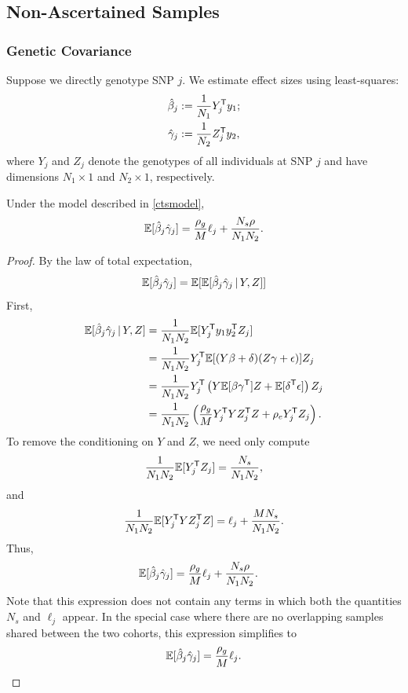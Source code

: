 \documentclass[11pt]{article}
\numberwithin{equation}{section}
\numberwithin{definition}{section}
\numberwithin{thm}{section}
\numberwithin{lemma}{section}
\numberwithin{prop}{section}
\numberwithin{cor}{section}
\numberwithin{hyp}{section}
\begin{document}
\subsection{Non-Ascertained Samples}
\subsubsection{Genetic Covariance}
\label{supp_condexp_qt}
Suppose we directly genotype SNP $j$. 
We estimate effect sizes using least-squares: 
\begin{align*}
	\hat{\beta}_j &:= \frac{1}{N_1}Y^{\mathsf{T}}_jy_1;\\
	\hat{\gamma}_j &:= \frac{1}{N_2}Z^{\mathsf{T}}_jy_2,
\end{align*}
where $Y_j$ and $Z_j$ denote the genotypes of all individuals at SNP $j$ 
and have dimensions $N_1\times 1$ and $N_2\times 1$, respectively.

\begin{prop} 
Under the model described in \ref{ctsmodel}, 
\begin{equation}
	\mathbb{E}[\hat{\beta}_j\hat{\gamma}_j] = \frac{\rho_g}{M}\ell_j  + \frac{N_s\rho}{N_1N_2}.
\end{equation}
\end{prop}

\begin{proof} By the law of total expectation, 
$$\mathbb{E}[\hat{\beta}_j\hat{\gamma}_j] = \mathbb{E}[ \mathbb{E}[\hat{\beta}_j\hat{\gamma}_j \,|\, Y, Z ] ]$$
\noindent
First,
\begin{align*}
	\mathbb{E}[\hat{\beta}_j\hat{\gamma}_j\,|\,Y,Z] &= \frac{1}{N_1N_2}\mathbb{E}[Y^{\mathsf{T}}_jy_1y_2^{\mathsf{T}}Z_j]   \\
       		&= \frac{1}{N_1N_2}Y^{\mathsf{T}}_j\mathbb{E}[{(Y\beta+\delta)}(Z\gamma+\epsilon)]Z_j\\
        		&= \frac{1}{N_1N_2}Y^{\mathsf{T}}_j\left(Y\mathbb{E}[\beta\gamma^{\mathsf{T}}]Z + \mathbb{E}[\delta^{\mathsf{T}}\epsilon]\right)Z_j\\
        		&= \frac{1}{N_1N_2}\left( \frac{\rho_g}{M} Y^{\mathsf{T}}_jYZ^{\mathsf{T}}_jZ  + \rho_eY^{\mathsf{T}}_jZ_j  \right).
\end{align*}
\noindent
To remove the conditioning on $Y$ and $Z$, we need only compute 
$$\frac{1}{N_1N_2}\mathbb{E}[Y^{\mathsf{T}}_jZ_j ] = \frac{N_s}{N_1N_2},$$ 
and 
$$\frac{1}{N_1N_2}\mathbb{E}[Y^{\mathsf{T}}_jYZ^{\mathsf{T}}_jZ] = \ell_j + \frac{MN_s}{N_1N_2}.$$
Thus, 
\begin{align*}
    \mathbb{E}[\hat{\beta}_j\hat{\gamma}_j] &= \frac{\rho_g}{M}\ell_j  + \frac{N_s\rho}{N_1N_2}.
\end{align*}
Note that this expression does not contain any terms in which both the quantities $N_s$ and $\ell_j$ appear. 
In the special case where there are no overlapping samples shared between the two cohorts, this expression simplifies to 
\begin{equation*}
	\mathbb{E}[\hat{\beta}_j\hat{\gamma}_j] = \frac{\rho_g}{M}\ell_j.
\end{equation*}
\end{proof}
\end{document}
